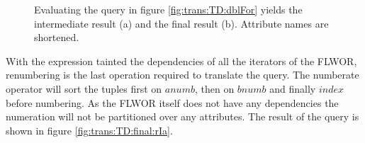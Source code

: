 \begin{myExample}
\begin{figure}[h]
\centering
{}
\qquad
{}
\caption[Example: resolving simple FLWOR]{Evaluating the query in figure \ref{fig:trans:TD:dblFor} yields the
intermediate result (a) and the final result (b). Attribute names are
shortened.
\label{fig:trans:TD:finaliseExp}}
\end{figure}

With the expression tainted the dependencies of all the iterators of the FLWOR, renumbering is the last operation
required to translate the query. The \textsf{numberate} operator will sort the tuples first on $anumb$, then on
$bnumb$ and finally $index$ before numbering. As the FLWOR itself does not have any dependencies the numeration
will not be partitioned over any attributes. The result of the query is shown in figure
\ref{fig:trans:TD:final:rIa}.
\end{myExample}

